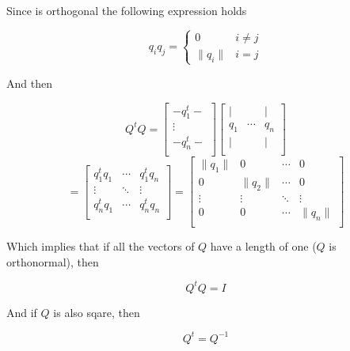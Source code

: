 \documentclass[12pt,journal]{IEEEtran}
\begin{document}
    Since is orthogonal the following expression holds

    \[
        q_i q_j =
        \begin{cases}
           0 & i \neq j \\
           \lVert q_i \rVert & i = j
        \end{cases}
    \]

    And then

    \[
        Q^t Q =
        \begin{bmatrix}
             - q_1^t - \\
               \vdots  \\
             - q_n^t - \\
        \end{bmatrix}
        \begin{bmatrix}
             |  &        &  | \\
            q_1 & \cdots & q_n\\
             |  &        &  | \\
        \end{bmatrix}
    \]
    \[
        =
        \begin{bmatrix}
            q_1^t q_1 & \cdots & q_1^t q_n \\
              \vdots  & \ddots &  \vdots   \\
            q_n^t q_1 & \cdots & q_n^t q_n \\
        \end{bmatrix}
        =
        \begin{bmatrix}
          \lVert q_1 \rVert &         0         & \cdots &         0    \\
                  0         & \lVert q_2 \rVert & \cdots &         0    \\
               \vdots       &       \vdots      & \ddots &       \vdots \\
                  0         &         0         & \cdots & \lVert q_n \rVert \\
        \end{bmatrix}
    \]

    Which implies that if all the vectors of $Q$ have a length of one ($Q$ is
    orthonormal), then

    \begin{equation*}
        Q^t Q = I
    \end{equation*}

    And if $Q$ is also sqare, then

    \begin{equation*}
        Q^t = Q^{-1}
    \end{equation*}
\end{document}
